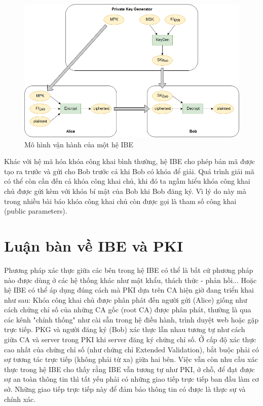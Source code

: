 \documentclass[class=report, crop=false]{standalone}
\begin{document}
		\begin{figure}
			\captionsetup{font=normalsize}
			\includegraphics[width=\textwidth]{ibe_protocol.png}
			\centering
			\caption{Mô hình vận hành của một hệ IBE}
		\end{figure}
		Khác với hệ mã hóa khóa công khai bình thường, hệ IBE cho phép bản mã được tạo ra trước và gửi cho Bob trước cả khi Bob có khóa để giải. Quá trình giải mã có thể còn cần đến cả khóa công khai chủ, khi đó ta ngầm hiểu khóa công khai chủ được gửi kèm với khóa bí mật của Bob khi Bob đăng ký. Vì lý do này mà trong nhiều bài báo khóa công khai chủ còn được gọi là tham số công khai (public parameters).
	\section{Luận bàn về IBE và PKI}
		Phương pháp xác thực giữa các bên trong hệ IBE có thể là bất cứ phương pháp nào được dùng ở các hệ thống khác như mật khẩu, thách thức - phản hồi... Hoặc hệ IBE có thể áp dụng đúng cách mà PKI dựa trên CA hiện giờ đang triển khai như sau: Khóa công khai chủ được phân phát đến người gửi (Alice) giống như cách chứng chỉ số của những CA gốc (root CA) được phân phát, thường là qua các kênh "chính thống" như cài sẵn trong hệ điều hành, trình duyệt web hoặc gặp trực tiếp. PKG và người đăng ký (Bob) xác thực lẫn nhau tương tự như cách giữa CA và server trong PKI khi server đăng ký chứng chỉ số. Ở cấp độ xác thực cao nhất của chứng chỉ số (như chứng chỉ Extended Validation), bắt buộc phải có sự tương tác trực tiếp (không phải từ xa) giữa hai bên. Việc vẫn còn nhu cầu xác thực trong hệ IBE cho thấy rằng IBE vẫn tương tự như PKI, ở chỗ, để đạt được sự an toàn thông tin thì tất yếu phải có những giao tiếp trực tiếp ban đầu làm cơ sở. Những giao tiếp trực tiếp này để đảm bảo thông tin có được là thực sự và chính xác.
		
\end{document}
